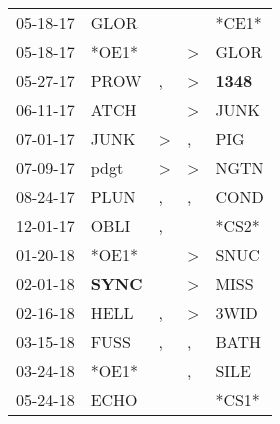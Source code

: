 \begin{supertabular}{p{0.07\textwidth}p{0.06\textwidth}p{0.02\textwidth}p{0.02\textwidth}p{0.06\textwidth}}
          05-18-17\textsuperscript{} &           GLOR\textsuperscript{} &                  &                  &                            *CE1* \\
          05-18-17\textsuperscript{} &                            *OE1* &                  &     \textgreater &           GLOR\textsuperscript{} \\
          05-27-17\textsuperscript{} &           PROW\textsuperscript{} &                , &     \textgreater &  \textbf{1348\textsuperscript{}} \\
          06-11-17\textsuperscript{} &           ATCH\textsuperscript{} &                  &     \textgreater &           JUNK\textsuperscript{} \\
          07-01-17\textsuperscript{} &           JUNK\textsuperscript{} &     \textgreater &                , &            PIG\textsuperscript{} \\
          07-09-17\textsuperscript{} &           pdgt\textsuperscript{} &     \textgreater &     \textgreater &           NGTN\textsuperscript{} \\
          08-24-17\textsuperscript{} &           PLUN\textsuperscript{} &                , &                , &           COND\textsuperscript{} \\
          12-01-17\textsuperscript{} &           OBLI\textsuperscript{} &                , &                  &                            *CS2* \\
          01-20-18\textsuperscript{} &                            *OE1* &                  &     \textgreater &           SNUC\textsuperscript{} \\
          02-01-18\textsuperscript{} &  \textbf{SYNC\textsuperscript{}} &                  &     \textgreater &           MISS\textsuperscript{} \\
          02-16-18\textsuperscript{} &           HELL\textsuperscript{} &                , &     \textgreater &           3WID\textsuperscript{} \\
          03-15-18\textsuperscript{} &           FUSS\textsuperscript{} &                , &                , &           BATH\textsuperscript{} \\
          03-24-18\textsuperscript{} &                            *OE1* &                  &                , &           SILE\textsuperscript{} \\
          05-24-18\textsuperscript{} &           ECHO\textsuperscript{} &                  &                  &                            *CS1* \\

\end{supertabular}
